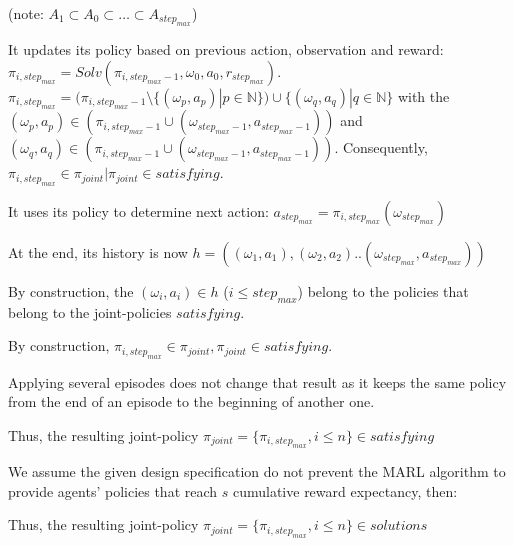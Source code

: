 \begin{proofoutline}
    (note: $A_1 \subset A_0 \subset \dots \subset A_{step_{max}}$)

    It updates its policy based on previous action, observation and reward: $\pi_{i,step_{max}} = Solv(\pi_{i,step_{max}-1}, \omega_0, a_0, r_{step_{max}})$.
    $\pi_{i,step_{max}} = (\pi_{i,step_{max}-1} \setminus \{(\omega_p, a_p) | p \in \mathbb{N}\}) \cup \{(\omega_q, a_q) | q \in \mathbb{N}\}$ with the $(\omega_p, a_p) \in (\pi_{i,step_{max}-1} \cup {(\omega_{step_{max}-1}, a_{step_{max}-1})})$ and $(\omega_q, a_q) \in (\pi_{i,step_{max}-1} \cup {(\omega_{step_{max}-1}, a_{step_{max}-1})})$. Consequently, $\pi_{i,step_{max}} \in \pi_{joint} | \pi_{joint} \in satisfying$.

    It uses its policy to determine next action: $a_{step_{max}} = \pi_{i,step_{max}}(\omega_{step_{max}})$

    At the end, its history is now $h = ((\omega_1, a_1), (\omega_2, a_2)..(\omega_{step_{max}}, a_{step_{max}}))$

    By construction, the $(\omega_i,a_i) \in h$ ($i \leq step_{max}$) belong to the policies that belong to the joint-policies $satisfying$.

    By construction, $\pi_{i,step_{max}} \in \pi_{joint}, \pi_{joint} \in satisfying$.

    Applying several episodes does not change that result as it keeps the same policy from the end of an episode to the beginning of another one.

    Thus, the resulting joint-policy $\pi_{joint} = \{\pi_{i,step_{max}}, i \leq n\} \in satisfying$

    We assume the given design specification do not prevent the MARL algorithm to provide agents' policies that reach $s$ cumulative reward expectancy, then:

    Thus, the resulting joint-policy $\pi_{joint} = \{\pi_{i,step_{max}}, i \leq n\} \in solutions$

\end{proofoutline}